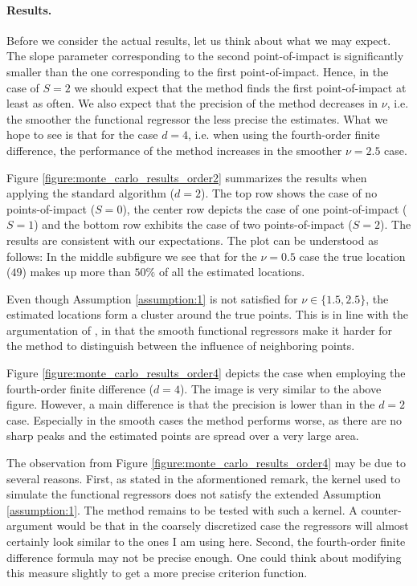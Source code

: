 \paragraph{Results.}

Before we consider the actual results, let us think about what we may expect. The slope
parameter corresponding to the second point-of-impact is significantly smaller than the
one corresponding to the first point-of-impact. Hence, in the case of $S = 2$ we should
expect that the method finds the first point-of-impact at least as often. We also expect
that the precision of the method decreases in $\nu$, i.e. the smoother the functional
regressor the less precise the estimates. What we hope to see is that for the case $d =
4$, i.e. when using the fourth-order finite difference, the performance of the method
increases in the smoother $\nu = 2.5$ case.

Figure \ref{figure:monte_carlo_results_order2} summarizes the results when applying the
standard algorithm ($d = 2$). The top row shows the case of no points-of-impact ($S =
0$), the center row depicts the case of one point-of-impact ($S = 1$) and the bottom row
exhibits the case of two points-of-impact ($S = 2$). The results are consistent with our
expectations. The plot can be understood as follows: In the middle subfigure we see that
for the $\nu = 0.5$ case the true location ($49$) makes up more than $50\%$ of all the
estimated locations.

Even though Assumption \ref{assumption:1} is not satisfied for $\nu \in \{1.5, 2.5\}$,
the estimated locations form a cluster around the true points. This is in line with the
argumentation of \cite{Kneip2020}, in that the smooth functional regressors make it
harder for the method to distinguish between the influence of neighboring points.

Figure \ref{figure:monte_carlo_results_order4} depicts the case when employing the
fourth-order finite difference ($d = 4$). The image is very similar to the above figure.
However, a main difference is that the precision is lower than in the $d=2$ case.
Especially in the smooth cases the method performs worse, as there are no sharp
peaks and the estimated points are spread over a very large area.

The observation from Figure \ref{figure:monte_carlo_results_order4} may be due to
several reasons. First, as stated in the aformentioned remark, the kernel used to
simulate the functional regressors does not satisfy the extended Assumption
\ref{assumption:1}. The method remains to be tested with such a kernel. A
counter-argument would be that in the coarsely discretized case the regressors will
almost certainly look similar to the ones I am using here. Second, the fourth-order
finite difference formula may not be precise enough. One could think about modifying
this measure slightly to get a more precise criterion function.

